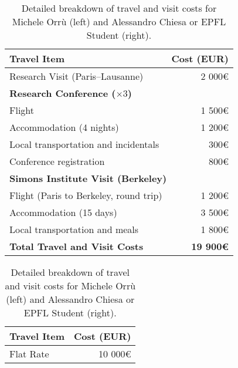\documentclass{article}
\begin{document}
\begin{table}[t]
    \centering
    \caption{Detailed breakdown of travel and visit costs for Michele Orrù (left) and Alessandro Chiesa or EPFL Student (right).}
    \begin{tabular}[t]{|l|r|}
        \hline
        \textbf{Travel Item} & \textbf{Cost (EUR)} \\
        \hline\hline
        Research Visit (Paris--Lausanne) & 2 000\euro{} \\
        \hline
        \multicolumn{2}{|l|}{\textbf{Research Conference (\(\times 3\))}} \\
        \hline
        Flight & 1 500\euro{} \\
        Accommodation (4 nights) & 1 200\euro{} \\
        Local transportation and incidentals & 300\euro{} \\
        Conference registration & 800\euro{} \\
        \hline
        \multicolumn{2}{|l|}{\textbf{Simons Institute Visit (Berkeley)}} \\
        \hline
        Flight (Paris to Berkeley, round trip) & 1 200\euro{} \\
        Accommodation (15 days) & 3 500\euro{} \\
        Local transportation and meals & 1 800\euro{} \\
        \hline\hline
        \rowcolor{lightgray}
        \textbf{Total Travel and Visit Costs} & \textbf{19 900\euro{}} \\
        \hline
    \end{tabular}
    \begin{tabular}[t]{|l|r|}
        \hline
        \textbf{Travel Item} & \textbf{Cost (EUR)} \\
        \hline\hline
        Flat Rate & 10 000\euro{} \\

\end{tabular}
\end{table}
\end{document}
